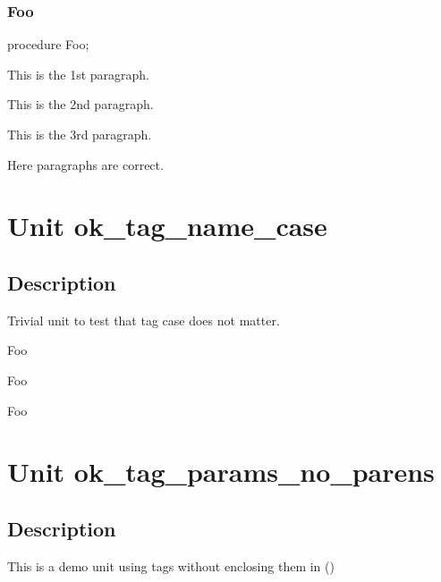 \documentclass{report}
\begin{document}
\subsection*{Foo}
\begin{list}{}{
\setlength{\itemindent}{0cm}
\setlength{\listparindent}{0cm}
\setlength{\leftmargin}{\evensidemargin}
\addtolength{\leftmargin}{\tmplength}
\settowidth{\labelsep}{X}
\addtolength{\leftmargin}{\labelsep}
\setlength{\labelwidth}{\tmplength}
}
\begin{flushleft}
\item[\textbf{Declaration}\hfill]
\begin{ttfamily}
procedure Foo;\end{ttfamily}


\end{flushleft}
\par
\item[\textbf{Description}]
This is the 1st paragraph.

This is the 2nd paragraph.

This is the 3rd paragraph.

Here paragraphs are correct.

\end{list}
\chapter{Unit ok{\_}tag{\_}name{\_}case}
\section{Description}
Trivial unit to test that tag case does not matter.

\begin{ttfamily}Foo\end{ttfamily}

\begin{ttfamily}Foo\end{ttfamily}

\begin{ttfamily}Foo\end{ttfamily}
\chapter{Unit ok{\_}tag{\_}params{\_}no{\_}parens}
\section{Description}
This is a demo unit using tags without enclosing them in ()\hfill\vspace*{1ex}
\end{document}
